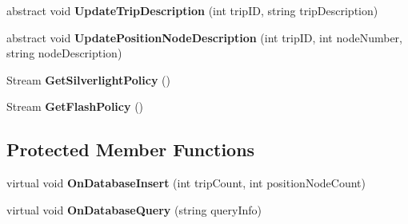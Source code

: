 \begin{DoxyCompactItemize}
\item 
\hypertarget{class_tripi_w_c_f_1_1_service_1_1_trip_service_a81b3091acfc87b1b53c717134df0e45f}{
abstract void {\bfseries UpdateTripDescription} (int tripID, string tripDescription)}
\label{class_tripi_w_c_f_1_1_service_1_1_trip_service_a81b3091acfc87b1b53c717134df0e45f}

\item 
\hypertarget{class_tripi_w_c_f_1_1_service_1_1_trip_service_a05c27415efabd39a9a3a41ab8a333fa7}{
abstract void {\bfseries UpdatePositionNodeDescription} (int tripID, int nodeNumber, string nodeDescription)}
\label{class_tripi_w_c_f_1_1_service_1_1_trip_service_a05c27415efabd39a9a3a41ab8a333fa7}

\item 
\hypertarget{class_tripi_w_c_f_1_1_service_1_1_trip_service_a746729f84fa9a52e530789c7997408f5}{
Stream {\bfseries GetSilverlightPolicy} ()}
\label{class_tripi_w_c_f_1_1_service_1_1_trip_service_a746729f84fa9a52e530789c7997408f5}

\item 
\hypertarget{class_tripi_w_c_f_1_1_service_1_1_trip_service_a07ae9a6e7ef2128f9b81b00760cd6883}{
Stream {\bfseries GetFlashPolicy} ()}
\label{class_tripi_w_c_f_1_1_service_1_1_trip_service_a07ae9a6e7ef2128f9b81b00760cd6883}

\end{DoxyCompactItemize}
\subsection*{Protected Member Functions}
\begin{DoxyCompactItemize}
\item 
\hypertarget{class_tripi_w_c_f_1_1_service_1_1_trip_service_a518d3c488db62624722c4c94f27394f4}{
virtual void {\bfseries OnDatabaseInsert} (int tripCount, int positionNodeCount)}
\label{class_tripi_w_c_f_1_1_service_1_1_trip_service_a518d3c488db62624722c4c94f27394f4}

\item 
\hypertarget{class_tripi_w_c_f_1_1_service_1_1_trip_service_ac6c9da0776d2f882f8a834f69dc378e8}{
virtual void {\bfseries OnDatabaseQuery} (string queryInfo)}
\label{class_tripi_w_c_f_1_1_service_1_1_trip_service_ac6c9da0776d2f882f8a834f69dc378e8}

\end{DoxyCompactItemize}
